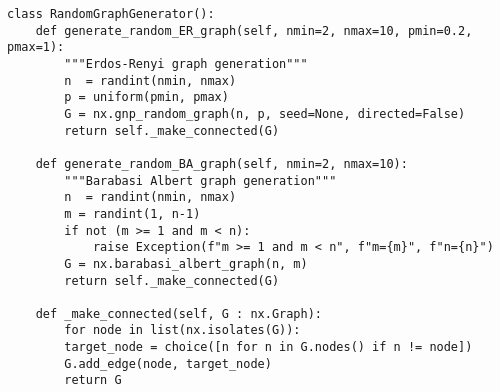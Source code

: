 \begin{lstlisting}[label={code:random_graph_generator}, caption={Random Graph Generator}]
class RandomGraphGenerator():
	def generate_random_ER_graph(self, nmin=2, nmax=10, pmin=0.2, pmax=1):
		"""Erdos-Renyi graph generation"""
		n  = randint(nmin, nmax)
		p = uniform(pmin, pmax)
		G = nx.gnp_random_graph(n, p, seed=None, directed=False)
		return self._make_connected(G)

	def generate_random_BA_graph(self, nmin=2, nmax=10):
		"""Barabasi Albert graph generation"""
		n  = randint(nmin, nmax)
		m = randint(1, n-1)
		if not (m >= 1 and m < n):
			raise Exception(f"m >= 1 and m < n", f"m={m}", f"n={n}")
		G = nx.barabasi_albert_graph(n, m)
		return self._make_connected(G)
	
	def _make_connected(self, G : nx.Graph):
		for node in list(nx.isolates(G)):
		target_node = choice([n for n in G.nodes() if n != node])
		G.add_edge(node, target_node)
		return G
\end{lstlisting}